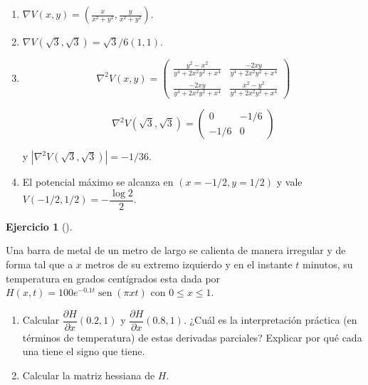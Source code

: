\documentclass[
  a4paper,
]{scrreport}
\theoremstyle{definition}
\newtheorem{exercise}{Ejercicio}[chapter]
\theoremstyle{remark}
\begin{document}
\begin{tcolorbox}[enhanced jigsaw, leftrule=.75mm, colbacktitle=quarto-callout-tip-color!10!white, toprule=.15mm, title=\textcolor{quarto-callout-tip-color}{\faLightbulb}\hspace{0.5em}{Solución}, bottomtitle=1mm, breakable, coltitle=black, colback=white, bottomrule=.15mm, colframe=quarto-callout-tip-color-frame, titlerule=0mm, toptitle=1mm, left=2mm, arc=.35mm, rightrule=.15mm, opacitybacktitle=0.6, opacityback=0]

\begin{enumerate}
\def\labelenumi{\alph{enumi}.}
\item
  \(\nabla V(x,y) = \left( \frac{x}{x^2+y^2},\frac{y}{x^2+y^2}\right)\).
\item
  \(\nabla V(\sqrt 3, \sqrt 3) = \sqrt 3 /6(1,1)\).
\item
  \[
  \nabla^2V(x,y) = \left(
  \begin{array}{cc}
  \frac{y^2-x^2}{y^4+2x^2y^2+x^4} & \frac{-2xy}{y^4+2x^2y^2+x^4} \\
  \frac{-2xy}{y^4+2x^2y^2+x^4} & \frac{x^2-y^2}{y^4+2x^2y^2+x^4}
  \end{array}
  \right)
  \]

  \[
  \nabla^2V(\sqrt{3},\sqrt{3}) = 
  \left(
  \begin{array}{cc}
  0 & -1/6 \\
  -1/6 & 0
  \end{array}
  \right)
  \]

  y \(|\nabla^2V(\sqrt 3,\sqrt 3)| = -1/36.\)
\item
  El potencial máximo se alcanza en \((x=-1/2, y=1/2)\) y vale
  \(V(-1/2,1/2) = -\dfrac{\log 2}{2}\).
\end{enumerate}

\end{tcolorbox}

\begin{exercise}[]\protect\hypertarget{exr-barra-metal}{}\label{exr-barra-metal}

Una barra de metal de un metro de largo se calienta de manera irregular
y de forma tal que a \(x\) metros de su extremo izquierdo y en el
instante \(t\) minutos, su temperatura en grados centígrados esta dada
por \(H(x,t) = 100e^{-0.1t}\operatorname{sen}(\pi xt)\) con
\(0\leq x \leq 1\).

\begin{enumerate}
\def\labelenumi{\alph{enumi}.}
\item
  Calcular \(\dfrac{\partial H}{\partial x}(0.2, 1)\) y
  \(\dfrac{\partial H}{\partial x}(0.8, 1).\) ¿Cuál es la interpretación
  práctica (en términos de temperatura) de estas derivadas parciales?
  Explicar por qué cada una tiene el signo que tiene.
\item
  Calcular la matriz hessiana de \(H\).
\end{enumerate}

\end{exercise}
\end{document}
